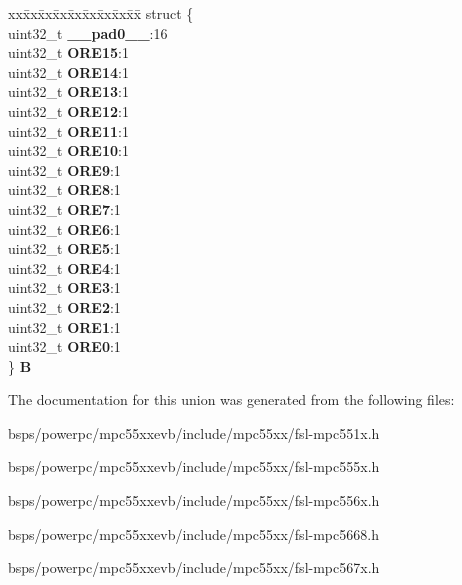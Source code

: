 \begin{DoxyCompactItemize}
\begin{tabbing}
\end{tabbing}\item 
\mbox{\label{unionSIU__tag_1_1SIU__ORER__tag_ad4c98715a3f308ae949808b8cc2aac37}} 
\begin{tabbing}
xx\=xx\=xx\=xx\=xx\=xx\=xx\=xx\=xx\=\kill
struct \{\\
\>uint32\_t {\bfseries \_\_pad0\_\_}:16\\
\>uint32\_t {\bfseries ORE15}:1\\
\>uint32\_t {\bfseries ORE14}:1\\
\>uint32\_t {\bfseries ORE13}:1\\
\>uint32\_t {\bfseries ORE12}:1\\
\>uint32\_t {\bfseries ORE11}:1\\
\>uint32\_t {\bfseries ORE10}:1\\
\>uint32\_t {\bfseries ORE9}:1\\
\>uint32\_t {\bfseries ORE8}:1\\
\>uint32\_t {\bfseries ORE7}:1\\
\>uint32\_t {\bfseries ORE6}:1\\
\>uint32\_t {\bfseries ORE5}:1\\
\>uint32\_t {\bfseries ORE4}:1\\
\>uint32\_t {\bfseries ORE3}:1\\
\>uint32\_t {\bfseries ORE2}:1\\
\>uint32\_t {\bfseries ORE1}:1\\
\>uint32\_t {\bfseries ORE0}:1\\
\} {\bfseries B}\\

\end{tabbing}\end{DoxyCompactItemize}


The documentation for this union was generated from the following files\+:\begin{DoxyCompactItemize}
\item 
bsps/powerpc/mpc55xxevb/include/mpc55xx/fsl-\/mpc551x.\+h\item 
bsps/powerpc/mpc55xxevb/include/mpc55xx/fsl-\/mpc555x.\+h\item 
bsps/powerpc/mpc55xxevb/include/mpc55xx/fsl-\/mpc556x.\+h\item 
bsps/powerpc/mpc55xxevb/include/mpc55xx/fsl-\/mpc5668.\+h\item 
bsps/powerpc/mpc55xxevb/include/mpc55xx/fsl-\/mpc567x.\+h\end{DoxyCompactItemize}
